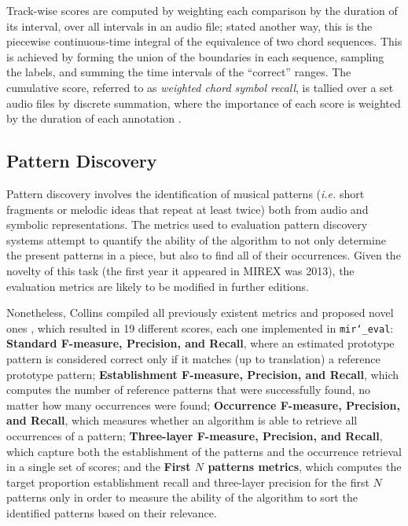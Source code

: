\documentclass{article}
\def\ie{\emph{i.e.}}
\def\mireval{\texttt{mir\char`_eval}}
\begin{document}
Track-wise scores are computed by weighting each comparison by the duration of its interval, over all intervals in an audio file; stated another way, this is the piecewise continuous-time integral of the equivalence of two chord sequences.
This is achieved by forming the union of the boundaries in each sequence, sampling the labels, and summing the time intervals of the ``correct'' ranges. 
The cumulative score, referred to as \emph{weighted chord symbol recall}, is tallied over a set audio files by discrete summation, where the importance of each score is weighted by the duration of each annotation \cite{choi2013mirex}.
 
\subsection{Pattern Discovery}

Pattern discovery involves the identification of musical patterns (\ie{} short fragments or melodic ideas that repeat at least twice) both from audio and symbolic representations.
The metrics used to evaluation pattern discovery systems attempt to quantify the ability of the algorithm to not only determine the present patterns in a piece, but also to find all of their occurrences.
Given the novelty of this task (the first year it appeared in MIREX was 2013), the evaluation metrics are likely to be modified in further editions.

Nonetheless, Collins compiled all previously existent metrics and proposed novel ones \cite{Collins2013}, which resulted in 19 different scores, each one implemented in \mireval{}:
\textbf{Standard F-measure, Precision, and Recall}, where an estimated prototype pattern is considered correct only if it matches (up to translation) a reference prototype pattern;
\textbf{Establishment F-measure, Precision, and Recall}, which computes the number of reference patterns that were successfully found, no matter how many occurrences were found;
\textbf{Occurrence F-measure, Precision, and Recall}, which measures whether an algorithm is able to retrieve all occurrences of a pattern;
\textbf{Three-layer F-measure, Precision, and Recall}, which capture both the establishment of the patterns and the occurrence retrieval in a single set of scores;
and the \textbf{First $N$ patterns metrics}, which computes the target proportion establishment recall and three-layer precision for the first $N$ patterns only in order to measure the ability of the algorithm to sort the identified patterns based on their relevance. 
\end{document}
